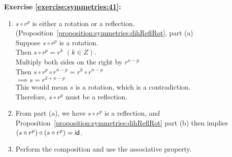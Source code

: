 \noindent\textbf{Exercise \ref{exercise:symmetries:41}:}
\begin{enumerate}[{a.}]
\item
$s\circ r^p$ is either a rotation or a reflection. (Proposition~\ref{proposition:symmetries:dihReflRot}, part (a)\\
Suppose $s\circ r^p$ is a rotation.\\
Then $s\circ r^p=r^k$ $(k\in Z)$.\\
Multiply both sides on the right by $r^{n-p}$\\
Then $s\circ r^p\circ r^{n-p}=r^k\circ r^{n-p}$\\
$\implies s=r^{k+n-p}$\\
This would mean $s$ is a rotation, which is a contradiction.\\
Therefore, $s\circ r^p$ must be a reflection.

\item
From part (a), we have $s\circ r^p$ is a reflection, and Proposition~\ref{proposition:symmetries:dihReflRot} part (b) then implies 
 $(s\circ r^p)\circ (s\circ r^p) = {\sf{i}d}$.
 
\item
Perform the composition and use the associative property.
\end{enumerate}

